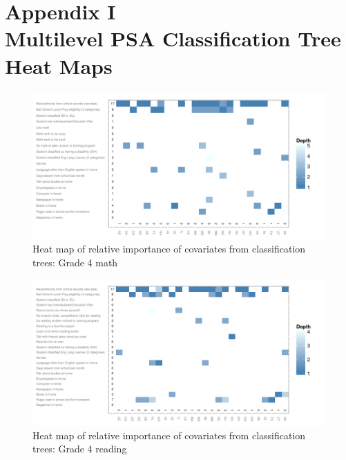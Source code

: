%
%
%
%



\clearpage
{}
\section*{Appendix I\\Multilevel PSA Classification Tree Heat Maps}
\label{appendixtree}

\begin{figure}[h!]
\begin{center}
\includegraphics[height=.37\textheight]{../Figures2009/g4math-mlpsa-ctree-heat.pdf}
\caption{Heat map of relative importance of covariates from classification trees: Grade 4 math}
\label{fig:g4math-mlpsa-ctree-heat}
\end{center}
\end{figure}

\begin{figure}[h!]
\begin{center}
\includegraphics[height=.37\textheight]{../Figures2009/g4read-mlpsa-ctree-heat.pdf}
\caption{Heat map of relative importance of covariates from classification trees: Grade 4 reading}
\label{fig:g4read-mlpsa-ctree-heat}
\end{center}
\end{figure}

